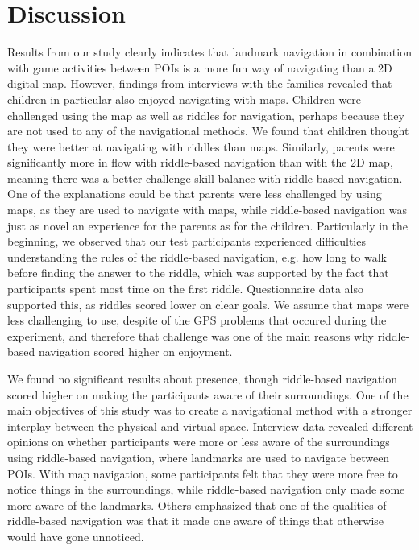 \section{Discussion}
Results from our study clearly indicates that landmark navigation in combination with game activities between POIs is a more fun way of navigating than a 2D digital map. However, findings from interviews with the families revealed that children in particular also enjoyed navigating with maps. Children were challenged using the map as well as riddles for navigation, perhaps because they are not used to any of the navigational methods. We found that children thought they were better at navigating with riddles than maps. Similarly, parents were significantly more in flow with riddle-based navigation than with the 2D map, meaning there was a better challenge-skill balance with riddle-based navigation. One of the explanations could be that parents were less challenged by using maps, as they are used to navigate with maps, while riddle-based navigation was just as novel an experience for the parents as for the children. Particularly in the beginning, we observed that our test participants experienced difficulties understanding the rules of the riddle-based navigation, e.g. how long to walk before finding the answer to the riddle, which was supported by the fact that participants spent most time on the first riddle. Questionnaire data also  supported this, as riddles scored lower on clear goals. We assume that maps were less challenging to use, despite of the GPS problems that occured during the experiment, and therefore that challenge was one of the main reasons why riddle-based navigation scored higher on enjoyment. 

We found no significant results about presence, though riddle-based navigation scored higher on making the participants aware of their surroundings. One of the main objectives of this study was to create a navigational method with a stronger interplay between the physical and virtual space. Interview data revealed different opinions on whether participants were more or less aware of the surroundings using riddle-based navigation, where landmarks are used to navigate between POIs. With map navigation, some participants felt that they were more free to notice things in the surroundings, while riddle-based navigation only made some more aware of the landmarks. Others emphasized that one of the qualities of riddle-based navigation was that it made one aware of things that otherwise would have gone unnoticed.

